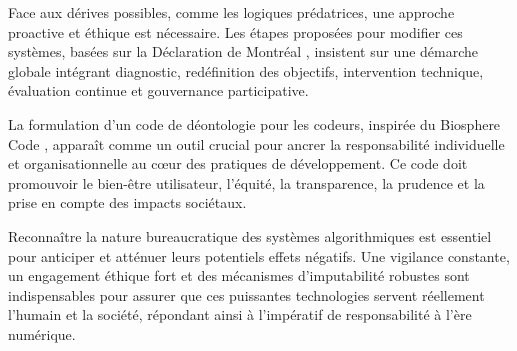 \documentclass[11pt,a4paper]{article}
\begin{document}
Face aux dérives possibles, comme les logiques prédatrices, une approche proactive et éthique est nécessaire. Les étapes proposées pour modifier ces systèmes, basées sur la Déclaration de Montréal \cite{DeclarationMontreal2018}, insistent sur une démarche globale intégrant diagnostic, redéfinition des objectifs, intervention technique, évaluation continue et gouvernance participative.

La formulation d'un code de déontologie pour les codeurs, inspirée du Biosphere Code \cite{BiosphereCode2015}, apparaît comme un outil crucial pour ancrer la responsabilité individuelle et organisationnelle au cœur des pratiques de développement. Ce code doit promouvoir le bien-être utilisateur, l'équité, la transparence, la prudence et la prise en compte des impacts sociétaux.

Reconnaître la nature bureaucratique des systèmes algorithmiques est essentiel pour anticiper et atténuer leurs potentiels effets négatifs. Une vigilance constante, un engagement éthique fort et des mécanismes d'imputabilité robustes sont indispensables pour assurer que ces puissantes technologies servent réellement l'humain et la société, répondant ainsi à l'impératif de responsabilité à l'ère numérique.



\nocite{*}
\clearpage
\tableofcontents
\end{document}
